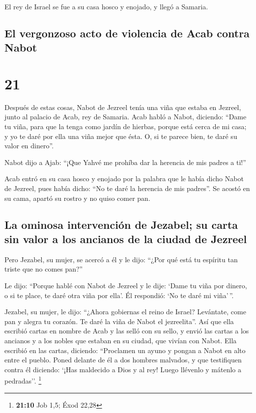  El rey de Israel se fue a su casa hosco y enojado, y
llegó a Samaria.

\hypertarget{el-vergonzoso-acto-de-violencia-de-acab-contra-nabot}{%
\subsection{El vergonzoso acto de violencia de Acab contra
Nabot}\label{el-vergonzoso-acto-de-violencia-de-acab-contra-nabot}}

\hypertarget{section-20}{%
\section{21}\label{section-20}}

 Después de estas cosas, Nabot de Jezreel tenía una viña
que estaba en Jezreel, junto al palacio de Acab, rey de Samaria.
 Acab habló a Nabot, diciendo: ``Dame tu viña, para que la
tenga como jardín de hierbas, porque está cerca de mi casa; y yo te daré
por ella una viña mejor que ésta. O, si te parece bien, te daré su valor
en dinero''.

 Nabot dijo a Ajab: ``¡Que Yahvé me prohíba dar la
herencia de mis padres a ti!''

 Acab entró en su casa hosco y enojado por la palabra que
le había dicho Nabot de Jezreel, pues había dicho: ``No te daré la
herencia de mis padres''. Se acostó en su cama, apartó su rostro y no
quiso comer pan.

\hypertarget{la-ominosa-intervenciuxf3n-de-jezabel-su-carta-sin-valor-a-los-ancianos-de-la-ciudad-de-jezreel}{%
\subsection{La ominosa intervención de Jezabel; su carta sin valor a los
ancianos de la ciudad de
Jezreel}\label{la-ominosa-intervenciuxf3n-de-jezabel-su-carta-sin-valor-a-los-ancianos-de-la-ciudad-de-jezreel}}

 Pero Jezabel, su mujer, se acercó a él y le dijo: ``¿Por
qué está tu espíritu tan triste que no comes pan?''

 Le dijo: ``Porque hablé con Nabot de Jezreel y le dije:
`Dame tu viña por dinero, o si te place, te daré otra viña por ella'. Él
respondió: `No te daré mi viña'\,''.

 Jezabel, su mujer, le dijo: ``¿Ahora gobiernas el reino
de Israel? Levántate, come pan y alegra tu corazón. Te daré la viña de
Nabot el jezreelita''.  Así que ella escribió cartas en
nombre de Acab y las selló con su sello, y envió las cartas a los
ancianos y a los nobles que estaban en su ciudad, que vivían con Nabot.
 Ella escribió en las cartas, diciendo: ``Proclamen un
ayuno y pongan a Nabot en alto entre el pueblo.  Poned
delante de él a dos hombres malvados, y que testifiquen contra él
diciendo: `¡Has maldecido a Dios y al rey! Luego llévenlo y mátenlo a
pedradas''. \footnote{\textbf{21:10} Job 1,5; Éxod 22,28}


